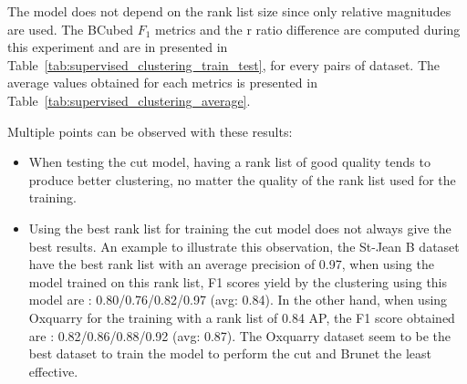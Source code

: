The model does not depend on the rank list size since only relative magnitudes are used.
The BCubed $F_1$ metrics and the r ratio difference are computed during this experiment and are in presented in Table~\ref{tab:supervised_clustering_train_test}, for every pairs of dataset.
The average values obtained for each metrics is presented in Table~\ref{tab:supervised_clustering_average}.

Multiple points can be observed with these results:
\begin{itemize}
  \item
  When testing the cut model, having a rank list of good quality tends to produce better clustering, no matter the quality of the rank list used for the training.
  \item
  Using the best rank list for training the cut model does not always give the best results.
  An example to illustrate this observation, the St-Jean B dataset have the best rank list with an average precision of 0.97, when using the model trained on this rank list, F1 scores yield by the clustering using this model are : 0.80/0.76/0.82/0.97 (avg: 0.84).
  In the other hand, when using Oxquarry for the training with a rank list of 0.84 AP, the F1 score obtained are : 0.82/0.86/0.88/0.92 (avg: 0.87).
  The Oxquarry dataset seem to be the best dataset to train the model to perform the cut and Brunet the least effective.
\end{itemize}

